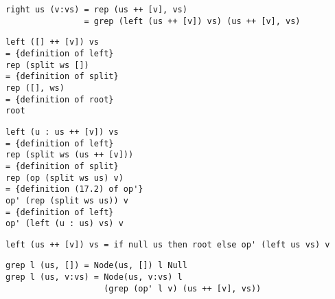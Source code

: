 \begin{verbatim}
right us (v:vs) = rep (us ++ [v], vs)
                = grep (left (us ++ [v]) vs) (us ++ [v], vs)
\end{verbatim}

\begin{verbatim}
left ([] ++ [v]) vs
= {definition of left}
rep (split ws [])
= {definition of split}
rep ([], ws)
= {definition of root}
root
\end{verbatim}

\begin{verbatim}
left (u : us ++ [v]) vs
= {definition of left}
rep (split ws (us ++ [v]))
= {definition of split}
rep (op (split ws us) v)
= {definition (17.2) of op'}
op' (rep (split ws us)) v
= {definition of left}
op' (left (u : us) vs) v
\end{verbatim}

\begin{verbatim}
left (us ++ [v]) vs = if null us then root else op' (left us vs) v
\end{verbatim}

\begin{verbatim}
grep l (us, []) = Node(us, []) l Null
grep l (us, v:vs) = Node(us, v:vs) l
                    (grep (op' l v) (us ++ [v], vs))
\end{verbatim}


